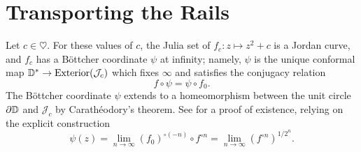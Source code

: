 
\section{Transporting the Rails} \label{rails-section}
Let $c\in \heartsuit$. For these values of $c$, the Julia set of $f_c: z\mapsto z^2+c$ is a Jordan curve, and $f_c$ has 
a Böttcher coordinate $\psi$ at infinity; 
namely, $\psi$ is the unique conformal map $\mathbb{D}^{*}\to\mathrm{Exterior}(\mathcal{J}_c)$  which fixes $\infty$ and satisfies the conjugacy relation 
$$
f\circ\psi=\psi\circ f_{0}.
$$
The Böttcher coordinate $\psi$ extends to a homeomorphism between the unit circle $\partial\mathbb{D}$ and $\mathcal{J}_c$ by Carathéodory's
theorem. See \cite[Theorem 9.5]{milnor_book} for a proof of existence, 
relying on the explicit construction 
\begin{equation}
	\psi(z)=\lim_{n\to \infty} (f_0)^{\circ (-n)} \circ f^{\circ n}=\lim_{n\to \infty} {(f^{\circ n})}^{1/2^n}.	
\end{equation}




